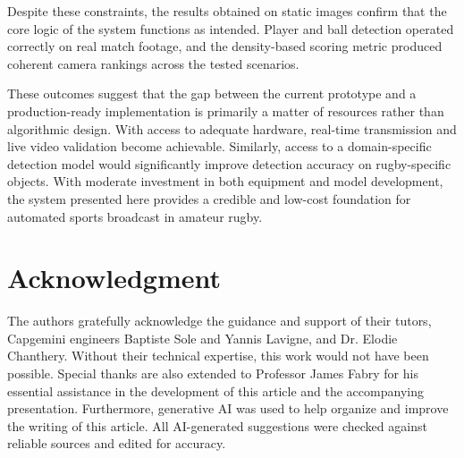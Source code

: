 \documentclass[conference]{IEEEtran}
\begin{document}
Despite these constraints, the results obtained on static images confirm that the core logic of the system functions as intended. Player and ball detection operated correctly on real match footage, and the density-based scoring metric produced coherent camera rankings across the tested scenarios.

These outcomes suggest that the gap between the current prototype and a production-ready implementation is primarily a matter of resources rather than algorithmic design. With access to adequate hardware, real-time transmission and live video validation become achievable. Similarly, access to a domain-specific detection model would significantly improve detection accuracy on rugby-specific objects. With moderate investment in both equipment and model development, the system presented here provides a credible and low-cost foundation for automated sports broadcast in amateur rugby.

\newpage

\section*{Acknowledgment}

The authors gratefully acknowledge the guidance and support of their tutors, Capgemini engineers Baptiste Sole and Yannis Lavigne, and Dr. Elodie Chanthery. Without their technical expertise, this work would not have been possible. Special thanks are also extended to Professor James Fabry for his essential assistance in the development of this article and the accompanying presentation.
Furthermore, generative AI was used to help organize and improve the writing of this article. All AI-generated suggestions were checked against reliable sources and edited for accuracy.

\newpage
\clearpage
\printbibliography  
\end{document}
